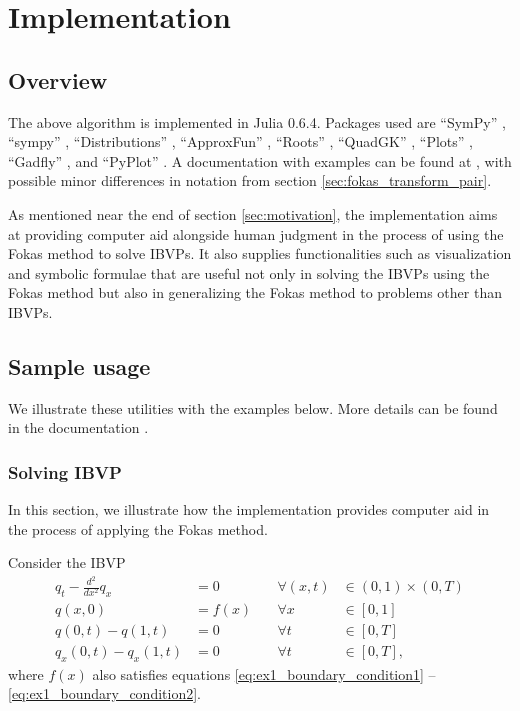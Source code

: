 \documentclass[11pt, oneside, a4paper]{article}
\begin{document}
\section{Implementation}
\subsection{Overview}
The above algorithm is implemented in Julia 0.6.4. Packages used are ``SymPy'' \cite{sympy}, ``sympy'' \cite{sympyPython},  ``Distributions'' \cite{distributions}, ``ApproxFun'' \cite{approxfun}, ``Roots'' \cite{roots}, ``QuadGK'' \cite{quadgk}, ``Plots'' \cite{plots}, ``Gadfly'' \cite{gadfly}, and ``PyPlot'' \cite{pyplot}. A documentation with examples can be found at \cite{Xiao}, with possible minor differences in notation from section \ref{sec:fokas_transform_pair}.

As mentioned near the end of section \ref{sec:motivation}, the implementation aims at providing computer aid alongside human judgment in the process of using the Fokas method to solve IBVPs. It also supplies functionalities such as visualization and symbolic formulae that are useful not only in solving the IBVPs using the Fokas method but also in generalizing the Fokas method to problems other than IBVPs. 


\subsection{Sample usage}
We illustrate these utilities with the examples below. More details can be found in the documentation \cite{Xiao}.

\subsubsection{Solving IBVP}\label{sec:ex1}
In this section, we illustrate how the implementation provides computer aid in the process of applying the Fokas method.

Consider the IBVP
\begin{subequations}\label{eq:ex1}
    \begin{alignat}{3}
        q_t - \frac{d^2}{dx^2}q_x &= 0\quad &\forall (x,t)&\in (0,1)\times (0,T) \label{eq:ex1_PDE}\\
        q(x,0) &= f(x) \quad &\forall x&\in [0,1]\label{eq:ex1_initial_condition}\\
        q(0,t) - q(1,t) &= 0 &\forall t&\in [0,T]\label{eq:ex1_boundary_condition1}\\
        q_x(0,t) - q_x(1,t) &= 0 &\forall t&\in [0,T]\label{eq:ex1_boundary_condition2},
    \end{alignat}
\end{subequations}
where $f(x)$ also satisfies equations \eqref{eq:ex1_boundary_condition1} -- \eqref{eq:ex1_boundary_condition2}.
\end{document}
